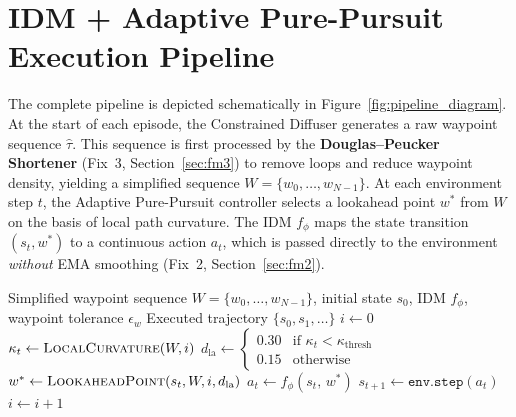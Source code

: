 \documentclass[12pt, a4paper, oneside]{report}
\theoremstyle{definition}
\newcommand{\dlookahead}{d_{\mathrm{la}}}
\newcommand{\norm}[1]{\left\|#1\right\|}
\begin{document}
\section{IDM + Adaptive Pure-Pursuit Execution Pipeline}
\label{sec:pipeline}

The complete pipeline is depicted schematically in
Figure~\ref{fig:pipeline_diagram}. At the start of each episode,
the Constrained Diffuser generates a raw waypoint sequence
$\hat{\tau}$. This sequence is first processed by the
\textbf{Douglas--Peucker Shortener} (Fix~3,
Section~\ref{sec:fm3}) to remove loops and reduce waypoint
density, yielding a simplified sequence
$W = \{w_0, \ldots, w_{N-1}\}$. At each environment step $t$, the
Adaptive Pure-Pursuit controller selects a lookahead point $w^*$
from $W$ on the basis of local path curvature. The IDM $f_\phi$
maps the state transition $(s_t, w^*)$ to a continuous action
$a_t$, which is passed directly to the environment \emph{without}
EMA smoothing (Fix~2, Section~\ref{sec:fm2}).

\begin{algorithm}[H]
\caption{IDM + Adaptive Pure-Pursuit Execution Loop}
\label{alg:pipeline}
\begin{algorithmic}[1]
\Require Simplified waypoint sequence
  $W = \{w_0,\ldots,w_{N-1}\}$,
  initial state $s_0$, IDM $f_\phi$, waypoint tolerance
  $\epsilon_w$
\Ensure Executed trajectory $\{s_0, s_1, \ldots\}$
\State $i \gets 0$ 
  \State $\kappa_t \gets \Call{LocalCurvature}{W, i}$
  \State $\dlookahead \gets
    \begin{cases}
      0.30 & \text{if } \kappa_t < \kappa_{\mathrm{thresh}}\\
      0.15 & \text{otherwise}
    \end{cases}$
  \State $w^* \gets \Call{LookaheadPoint}{s_t, W, i, \dlookahead}$
  \State $a_t \gets f_\phi(s_t,\, w^*)$
  \State $s_{t+1} \gets \texttt{env.step}(a_t)$
  \If{$\norm{s_{t+1}^{xy} - w_i} < \epsilon_w$}
    \State $i \gets i + 1$
  \EndIf
\EndWhile
\end{algorithmic}
\end{algorithm}
\end{document}
